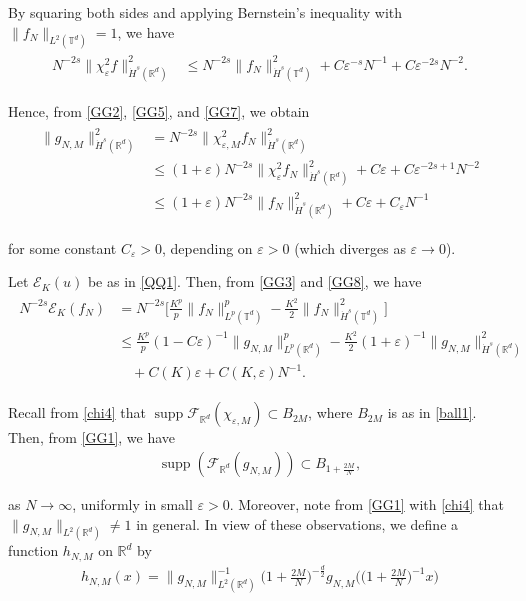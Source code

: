 \documentclass[letterpaper, 11pt,  reqno]{amsart}
\DeclareMathOperator*{\supp}{supp}
\newcommand{\noi}{\noindent}
\newcommand{\R}{\mathbb{R}}
\newcommand{\T}{\mathbb{T}}
\newcommand{\F}{\mathcal{F}}
\newcommand{\eps}{\varepsilon}
\newcommand{\EE}{\mathcal{E}}
\numberwithin{equation}{section}
\numberwithin{theorem}{section}
\begin{document}
\noi
By squaring both sides
and applying Bernstein's inequality
  with 
$\| f_N \|_{L^2(\T^d)} = 1$, 
 we have
\begin{align}
\begin{split}
N^{-2s}\| \chi^2_{\eps} f \|_{\dot H^{s}(\R^d)}^2
& \le
N^{-2s} \|f_N\|_{\dot H^{s}(\T^d)}^2+
C\eps^{-s}N^{-1}
+ 
C \eps^{-2s}N^{-2}.
\end{split}
\label{GG7}
\end{align}



\noi
Hence, from 
\eqref{GG2}, \eqref{GG5}, 
and 
\eqref{GG7}, we obtain
\begin{align}
\begin{split}
\|g_{N,M}\|^2_{\dot H^s(\R^d)}
&=N^{-2s}\| \chi^2_{\eps,M} f_N\|^2_{\dot H^s(\R^d)}\\
&\le 
(1 + \eps )
N^{-2s}\| \chi^2_{\eps} f_N\|^2_{\dot H^s(\R^d)}
+ C\eps + C\eps^{-2s + 1} N^{-2}\\
&\le (1 + \eps ) N^{-2s}\|  f_N\|^2_{\dot H^s(\R^d)}
+ C\eps + C_\eps N^{-1}
\end{split}
\label{GG8}
\end{align}

\noi
for some constant $C_\eps > 0$, depending on $\eps > 0$
(which diverges as $\eps \to 0$).



Let $\EE_K(u)$ be as in 
\eqref{QQ1}.
Then, from  \eqref{GG3} and \eqref{GG8}, 
we have 
\begin{align}
\begin{split}
N^{-2s} \EE_K(f_N)
& = 
N^{-2s}\bigg[ \frac{K^p}{p} \|f_N \|^p_{L^p (\T^d)} - \frac{K^2}2
\|f_N \|^2_{\dot H^s(\mathbb{T}^d)} \bigg]\\
&\le \frac{K^p}{p}(1-C\eps)^{-1}\|g_{N,M}\|^p_{L^{p}(\R^d)}
- \frac{K^2}{2}(1+\eps)^{-1}\|g_{N,M}\|^2_{\dot H^s(\R^d)}\\
& \quad + C(K) \eps + C(K, \eps) N^{-1}.
\end{split}
\label{GH1}
\end{align}



Recall from \eqref{chi4} that 
 $\supp \F_{\R^d} (\chi_{\eps, M}) \subset B_{2M}$, 
 where
$B_{2M}$ is as in \eqref{ball1}.
Then, from \eqref{GG1}, we have 
\begin{align*}
\supp (\F_{\R^d}(g_{N,M})) \subset B_{1+\frac{2M}N}, %
\end{align*}

\noi
as $N \to \infty$, uniformly in small $\eps > 0$.
Moreover, note  from 
\eqref{GG1} with \eqref{chi4}
that 
 $\|g_{N,M}\|_{L^{2}(\R^d)}\neq 1$ in general.
In view of these observations, 
 we define  
a function   $h_{N,M}$ on $\R^d$ by 
\begin{align}
h_{N,M}(x)=\|g_{N,M}\|^{-1}_{L^2(\R^d)}
\Big(1+\frac{2M}{N}\Big)^{-\frac{d}{2}}g_{N,M}\bigg(\Big(1+\frac{2M}{N}\Big)^{-1}x\bigg)
\label{GH3}
\end{align}
\end{document}
